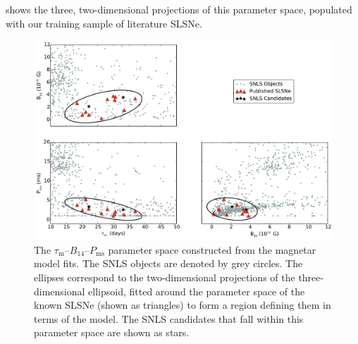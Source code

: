 \noindent {} shows the three, two-dimensional projections of this parameter space, populated with our training sample of literature SLSNe.

\begin{figure}
\includegraphics[width=\textwidth]{Figures/Chapter4/SLAPparam}
\caption{The $\tau_\mathrm{m}$--$B_{14}$--$P_{\mathrm{ms}}$ parameter space constructed from the magnetar model fits. The SNLS objects are denoted by grey circles. The ellipses correspond to the two-dimensional projections of the three-dimensional ellipsoid, fitted around the parameter space of the known SLSNe (shown as triangles) to form a region defining them in terms of the model. The SNLS candidates that fall within this parameter space are shown as stars.}
\label{fig:SLAPparam}
\end{figure}

